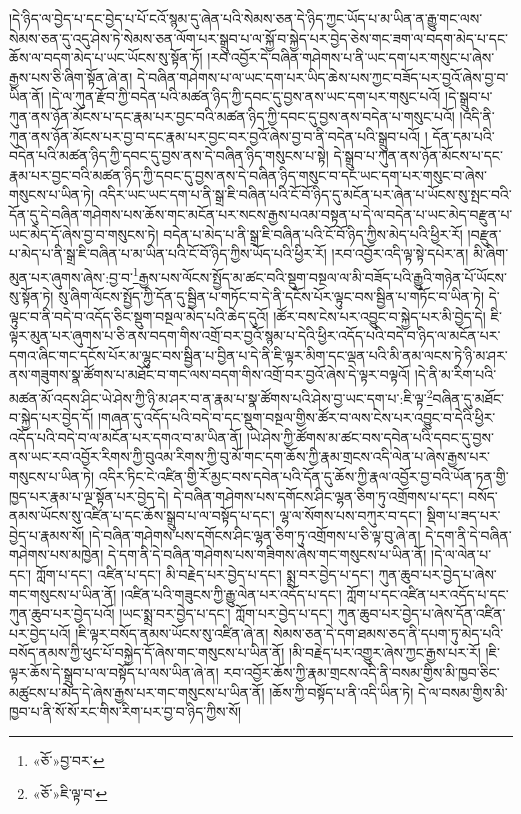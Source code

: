 །དེ་ཉིད་ལ་བྱེད་པ་དང་བྱེད་པ་པོ་ངའོ་སྙམ་དུ་ཞེན་པའི་སེམས་ཅན་དེ་ཉིད་ཀྱང་ཡོད་པ་མ་ཡིན་ན་རྒྱུ་གང་ལས་སེམས་ཅན་དུ་འདུ་ཤེས་ཏེ་སེམས་ཅན་ལོག་པར་སྒྲུབ་པ་ལ་སྐྱོ་བ་སྐྱེད་པར་བྱེད་ཅེས་གང་ཟག་ལ་བདག་མེད་པ་དང་ཆོས་ལ་བདག་མེད་པ་ཡང་ཡོངས་སུ་སྟོན་ཏོ། །རབ་འབྱོར་དེ་བཞིན་གཤེགས་པ་ནི་ཡང་དག་པར་གསུང་པ་ཞེས་རྒྱས་པས་ཅི་ཞིག་སྟོན་ཞེ་ན། དེ་བཞིན་གཤེགས་པ་ལ་ཡང་དག་པར་ཡིད་ཆེས་པས་ཀྱང་བཟོད་པར་བྱའོ་ཞེས་བྱ་བ་ཡིན་ནོ། །དེ་ལ་ཀུན་རྫོབ་ཀྱི་བདེན་པའི་མཚན་ཉིད་ཀྱི་དབང་དུ་བྱས་ནས་ཡང་དག་པར་གསུང་པའོ། །དེ་སྒྲུབ་པ་ཀུན་ནས་ཉོན་མོངས་པ་དང་རྣམ་པར་བྱང་བའི་མཚན་ཉིད་ཀྱི་དབང་དུ་བྱས་ནས་བདེན་པ་གསུང་པའོ། །འདི་ནི་ཀུན་ནས་ཉོན་མོངས་པར་བྱ་བ་དང་རྣམ་པར་བྱང་བར་བྱའོ་ཞེས་བྱ་བ་ནི་བདེན་པའི་སྒྲུབ་པའོ། །
དོན་དམ་པའི་བདེན་པའི་མཚན་ཉིད་ཀྱི་དབང་དུ་བྱས་ནས་དེ་བཞིན་ཉིད་གསུངས་པ་སྟེ། དེ་སྒྲུབ་པ་ཀུན་ནས་ཉོན་མོངས་པ་དང་རྣམ་པར་བྱང་བའི་མཚན་ཉིད་ཀྱི་དབང་དུ་བྱས་ནས་དེ་བཞིན་ཉིད་གསུང་བ་དང་ཡང་དག་པར་གསུང་བ་ཞེས་གསུངས་པ་ཡིན་ཏེ། འདིར་ཡང་ཡང་དག་པ་ནི་སྒྲ་ཇི་བཞིན་པའི་ངོ་བོ་ཉིད་དུ་མངོན་པར་ཞེན་པ་ཡོངས་སུ་སྤང་བའི་དོན་དུ་དེ་བཞིན་གཤེགས་པས་ཆོས་གང་མངོན་པར་སངས་རྒྱས་པའམ་བསྟན་པ་དེ་ལ་བདེན་པ་ཡང་མེད་བརྫུན་པ་ཡང་མེད་དོ་ཞེས་བྱ་བ་གསུངས་ཏེ། བདེན་པ་མེད་པ་ནི་སྒྲ་ཇི་བཞིན་པའི་ངོ་བོ་ཉིད་ཀྱིས་མེད་པའི་ཕྱིར་རོ། །བརྫུན་པ་མེད་པ་ནི་སྒྲ་ཇི་བཞིན་པ་མ་ཡིན་པའི་ངོ་བོ་ཉིད་ཀྱིས་ཡོད་པའི་ཕྱིར་རོ། །རབ་འབྱོར་འདི་ལྟ་སྟེ་དཔེར་ན། མི་ཞིག་མུན་པར་ཞུགས་ཞེས་:བྱ་བ་\footnote{«ཅོ་»བྱ་བར་}རྒྱས་པས་ལོངས་སྤྱོད་མ་ཚང་བའི་སྡུག་བསྔལ་ལ་མི་བཟོད་པའི་རྒྱུའི་གཉེན་པོ་ཡོངས་སུ་སྟོན་ཏེ། སུ་ཞིག་ལོངས་སྤྱོད་ཀྱི་དོན་དུ་སྦྱིན་པ་གཏོང་བ་དེ་ནི་དངོས་པོར་ལྟུང་བས་སྦྱིན་པ་གཏོང་བ་ཡིན་ཏེ། དེ་ལྟུང་བ་ནི་བདེ་བ་འདོད་ཅིང་སྡུག་བསྔལ་མེད་པའི་ཆེད་དུའོ། །ཚོར་བས་ངེས་པར་འབྱུང་བ་སྐྱེད་པར་མི་བྱེད་དེ། ཇི་ལྟར་མུན་པར་ཞུགས་པ་ཅི་ནས་བདག་གིས་འགྲོ་བར་བྱའོ་སྙམ་པ་དེའི་ཕྱིར་འདོད་པའི་བདེ་བ་ཉིད་ལ་མངོན་པར་དགའ་ཞིང་གང་དངོས་པོར་མ་ལྷུང་བས་སྦྱིན་པ་བྱིན་པ་དེ་ནི་ཇི་ལྟར་མིག་དང་ལྡན་པའི་མི་ནམ་ལངས་ཏེ་ཉི་མ་ཤར་ནས་གཟུགས་སྣ་ཚོགས་པ་མཐོང་བ་གང་ལས་བདག་གིས་འགྲོ་བར་བྱའོ་ཞེས་དེ་ལྟར་བལྟའོ། །དེ་ནི་མ་རིག་པའི་མཚན་མོ་འདས་ཤིང་ཡེ་ཤེས་ཀྱི་ཉི་མ་ཤར་བ་ན་རྣམ་པ་སྣ་ཚོགས་པའི་ཤེས་བྱ་ཡང་དག་པ་:ཇི་ལྟ་\footnote{«ཅོ་»ཇི་ལྟ་བ་}བཞིན་དུ་མཐོང་བ་སྐྱེད་པར་བྱེད་དོ། །གཞན་དུ་འདོད་པའི་བདེ་བ་དང་སྡུག་བསྔལ་གྱིས་ཚོར་བ་ལས་ངེས་པར་འབྱུང་བ་དེའི་ཕྱིར་འདོད་པའི་བདེ་བ་ལ་མངོན་པར་དགའ་བ་མ་ཡིན་ནོ། །ཡེ་ཤེས་ཀྱི་ཚོགས་མ་ཚང་བས་དབེན་པའི་དབང་དུ་བྱས་ནས་ཡང་རབ་འབྱོར་རིགས་ཀྱི་བུའམ་རིགས་ཀྱི་བུ་མོ་གང་དག་ཆོས་ཀྱི་རྣམ་གྲངས་འདི་ལེན་པ་ཞེས་རྒྱས་པར་གསུངས་པ་ཡིན་ཏེ། འདིར་ཏིང་ངེ་འཛིན་གྱི་རོ་མྱང་བས་དབེན་པའི་དོན་དུ་ཆོས་ཀྱི་རྣལ་འབྱོར་བྱ་བའི་ཡོན་ཏན་གྱི་ཁྱད་པར་རྣམ་པ་ལྔ་སྟོན་པར་བྱེད་དེ། དེ་བཞིན་གཤེགས་པས་དགོངས་ཤིང་ལྷན་ཅིག་ཏུ་འགྲོགས་པ་དང་། བསོད་ནམས་ཡོངས་སུ་འཛིན་པ་དང་ཆོས་སྒྲུབ་པ་ལ་བསྟོད་པ་དང་། ལྷ་ལ་སོགས་པས་བཀུར་བ་དང་། སྡིག་པ་ཟད་པར་བྱེད་པ་རྣམས་སོ། །དེ་བཞིན་གཤེགས་པས་དགོངས་ཤིང་ལྷན་ཅིག་ཏུ་འགྲོགས་པ་ཅི་ལྟ་བུ་ཞེ་ན། དེ་དག་ནི་དེ་བཞིན་གཤེགས་པས་མཁྱེན། དེ་དག་ནི་དེ་བཞིན་གཤེགས་པས་གཟིགས་ཞེས་གང་གསུངས་པ་ཡིན་ནོ། །དེ་ལ་ལེན་པ་དང་། ཀློག་པ་དང་། འཛིན་པ་དང་། མི་བརྗེད་པར་བྱེད་པ་དང་། སྨྲ་བར་བྱེད་པ་དང་། ཀུན་ཆུབ་པར་བྱེད་པ་ཞེས་གང་གསུངས་པ་ཡིན་ནོ། །འཛིན་པའི་གཟུངས་ཀྱི་རྒྱུ་ལེན་པར་འདོད་པ་དང་། ཀློག་པ་དང་འཛིན་པར་འདོད་པ་དང་ཀུན་ཆུབ་པར་བྱེད་པའོ། །ཡང་སྨྲ་བར་བྱེད་པ་དང་། ཀློག་པར་བྱེད་པ་དང་། ཀུན་ཆུབ་པར་བྱེད་པ་ཞེས་དོན་འཛིན་པར་བྱེད་པའོ། །ཇི་ལྟར་བསོད་ནམས་ཡོངས་སུ་འཛིན་ཞེ་ན། སེམས་ཅན་དེ་དག་ཐམས་ཅད་ནི་དཔག་ཏུ་མེད་པའི་བསོད་ནམས་ཀྱི་ཕུང་པོ་བསྐྱེད་དོ་ཞེས་གང་གསུངས་པ་ཡིན་ནོ། །མི་བརྗེད་པར་འགྱུར་ཞེས་ཀྱང་རྒྱས་པར་རོ། །ཇི་ལྟར་ཆོས་དེ་སྒྲུབ་པ་ལ་བསྟོད་པ་ལས་ཡིན་ཞེ་ན། རབ་འབྱོར་ཆོས་ཀྱི་རྣམ་གྲངས་འདི་ནི་བསམ་གྱིས་མི་ཁྱབ་ཅིང་མཚུངས་པ་མེད་དེ་ཞེས་རྒྱས་པར་གང་གསུངས་པ་ཡིན་ནོ། །ཆོས་ཀྱི་བསྟོད་པ་ནི་འདི་ཡིན་ཏེ། དེ་ལ་བསམ་གྱིས་མི་ཁྱབ་པ་ནི་སོ་སོ་རང་གིས་རིག་པར་བྱ་བ་ཉིད་ཀྱིས་སོ། 